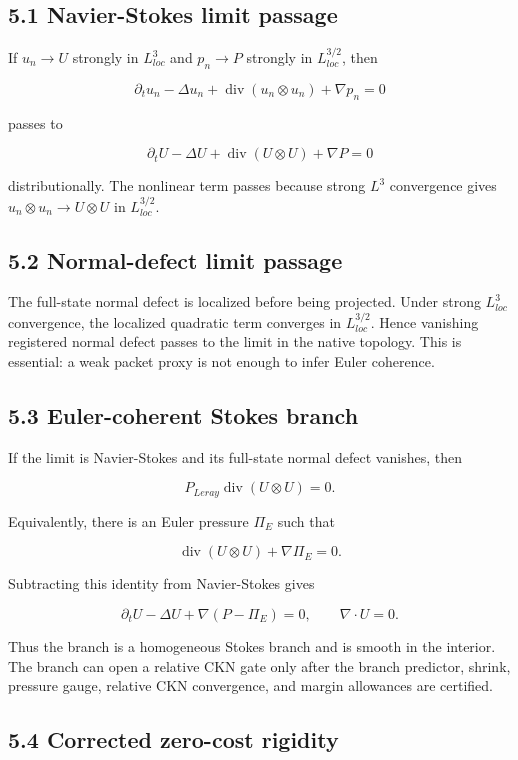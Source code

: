 \documentclass[11pt]{article}
\begin{document}
\subsection*{5.1 Navier-Stokes limit passage}

If \(u_n\to U\) strongly in \(L^3_{loc}\) and \(p_n\to P\) strongly in \(L^{3/2}_{loc}\), then

\[\partial_t u_n-\Delta u_n+\operatorname{div}(u_n\otimes u_n)+\nabla p_n=0\]

passes to

\[\partial_t U-\Delta U+\operatorname{div}(U\otimes U)+\nabla P=0\]

distributionally. The nonlinear term passes because strong \(L^3\) convergence gives \(u_n\otimes u_n\to U\otimes U\) in \(L^{3/2}_{loc}\).

\subsection*{5.2 Normal-defect limit passage}

The full-state normal defect is localized before being projected. Under strong \(L^3_{loc}\) convergence, the localized quadratic term converges in \(L^{3/2}_{loc}\). Hence vanishing registered normal defect passes to the limit in the native topology. This is essential: a weak packet proxy is not enough to infer Euler coherence.

\subsection*{5.3 Euler-coherent Stokes branch}

If the limit is Navier-Stokes and its full-state normal defect vanishes, then

\[P_{Leray}\operatorname{div}(U\otimes U)=0.\]

Equivalently, there is an Euler pressure \(\Pi_E\) such that

\[\operatorname{div}(U\otimes U)+\nabla\Pi_E=0.\]

Subtracting this identity from Navier-Stokes gives

\[\partial_t U-\Delta U+\nabla(P-\Pi_E)=0,\qquad \nabla\cdot U=0.\]

Thus the branch is a homogeneous Stokes branch and is smooth in the interior. The branch can open a relative CKN gate only after the branch predictor, shrink, pressure gauge, relative CKN convergence, and margin allowances are certified.

\subsection*{5.4 Corrected zero-cost rigidity}
\end{document}
